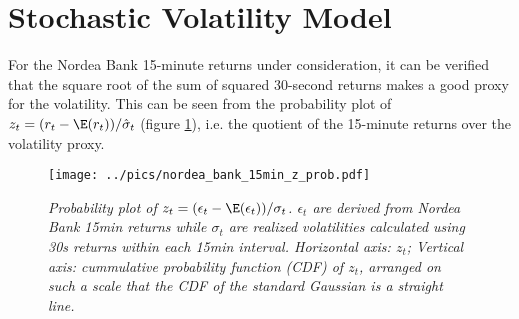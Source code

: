 \section{Stochastic Volatility Model}\label{sec:nordea_15min_arima}
For the Nordea Bank 15-minute returns under consideration, it can be
verified that the square root of the sum of squared 30-second returns
makes a good proxy for the volatility. This can be seen from the
probability plot of $z_t = (r_t - \E(r_t))/\hat{\sigma}_t$ (figure
\ref{fig:nordea_bank_15min_z_prob}), i.e. the quotient of the 
15-minute returns over the volatility proxy.
\begin{figure}[htb!]
  \centering
    \texttt{[image: ../pics/nordea\_bank\_15min\_z\_prob.pdf]}
  \caption{\small \it{Probability plot of $z_t =
      (\epsilon_t-\E(\epsilon_t))/\sigma_t$. $\epsilon_t$ are derived
      from Nordea Bank 15min returns while $\sigma_t$ are realized
      volatilities calculated
      using 30s returns within each 15min interval. Horizontal axis:
      $z_t$}; Vertical axis: cummulative probability function (CDF) of
    $z_t$, arranged on such a scale that the CDF of the standard
    Gaussian is a straight line.}
  \label{fig:nordea_bank_15min_z_prob}
\end{figure}

